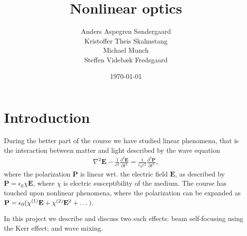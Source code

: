 \documentclass[a4paper,oneside,article]{memoir}
\newcommand\ppdiff[3][\partial]{\frac{#1^2 #2}{#1 #3^2}}
\newcommand{\order}[1]{^{\textup{(#1)}}} %
\begin{document}
\author{
  Anders Aspegren Søndergaard \\
  Kristoffer Theis Skalmstang \\
  Michael Munch \\
  Steffen Videbæk Fredsgaard \\
}
\title{Nonlinear optics}\date{\today}
\maketitle

\tableofcontents

\chapter{Introduction}
\label{cha:intro}

During the better part of the course we have studied linear phenomena,
that is the interaction between matter and light described by the wave
equation
\begin{align}
  \label{eq:wave-general}
  \nabla^2 \mathbf E - \frac{1}{c^2} \ppdiff{\mathbf E}{t}
  = \frac{1}{\epsilon_0c^2} \ppdiff{\mathbf P}{t},
\end{align}
where the polarization $\mathbf P$ is linear wrt. the electric field
$\mathbf E$, as described by $\mathbf P = \epsilon_0 \chi
\mathbf E$, where $\chi$ is electric susceptibility of the medium. The
course has touched upon nonlinear phenomena, where the polarization
can be expanded as $\mathbf P = \epsilon_0 ( \chi\order1 \mathbf E +
\chi\order2 \mathbf E^2 + \dots )$.

In this project we describe and discuss two such effects: beam
self-focusing using the Kerr effect; and wave mixing.










\nocite{*}
\printbibliography
\end{document}
